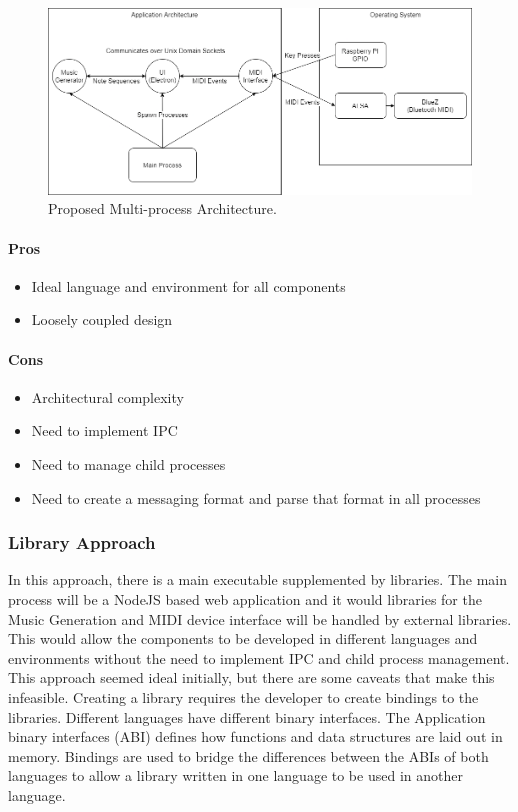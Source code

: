 \begin{figure}[h!]
  \centering
  \includegraphics[width=\linewidth]{image/multiprocess.png}
  \caption{Proposed Multi-process Architecture.}
  \label{fig:multiprocess}
\end{figure}

\paragraph{Pros}

\begin{itemize}
  \item Ideal language and environment for all components
  \item Loosely coupled design
\end{itemize}

\paragraph{Cons}

\begin{itemize}
  \item Architectural complexity
  \item Need to implement IPC
  \item Need to manage child processes
  \item Need to create a messaging format and parse that format in all processes
\end{itemize}

\subsubsection{Library Approach}

In this approach, there is a main executable supplemented by libraries. The main process
will be a NodeJS based web application and it would libraries for the Music Generation and
MIDI device interface will be handled by external libraries. This would allow the
components to be developed in different languages and environments without the need to
implement IPC and child process management. This approach seemed ideal initially, but
there are some caveats that make this infeasible. Creating a library requires the
developer to create bindings to the libraries. Different languages have different binary
interfaces. The Application binary interfaces (ABI) defines how functions and data
structures are laid out in memory. Bindings are used to bridge the differences between the
ABIs of both languages to allow a library written in one language to be used in another
language.

